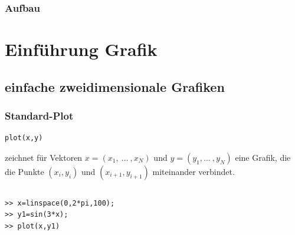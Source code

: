 \subtitle{Einheit 3 \\ Grafik, Arbeiten mit Polynomen }


\begin{frame}[fragile]
  \titlepage
\note{}
\end{frame}

\begin{frame}[fragile]
  \frametitle{Aufbau}
  \tableofcontents
\note{}
\end{frame}



\section{Einf\"uhrung Grafik}
\subsection{einfache zweidimensionale Grafiken}
% 
% 
\begin{frame}[fragile]\frametitle{Standard-Plot}
\begin{lstlisting}
plot(x,y)
\end{lstlisting}
zeichnet für Vektoren $x=(x_1, \ \dots \ ,x_N)$ und  $y=(y_1, \dots \ ,y_N)$
eine Grafik, die die Punkte $(x_i,y_i)$ und $(x_{i+1},y_{i+1})$ miteinander
verbindet.

\begin{columns}[c]
\begin{lstlisting}
>> x=linspace(0,2*pi,100);
>> y1=sin(3*x);
>> plot(x,y1)
\end{lstlisting}
\end{columns}
\end{frame}
% 
% 
